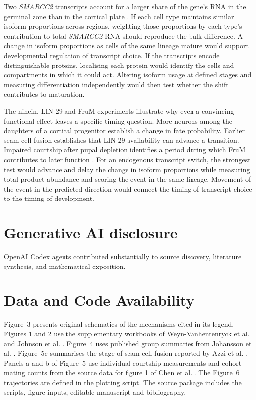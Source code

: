 \documentclass[11pt,a4paper]{article}
\begin{document}
Two \textit{SMARCC2} transcripts account for a larger share of the gene's RNA in the germinal zone than in the cortical plate \cite{Patowary2024}. If each cell type maintains similar isoform proportions across regions, weighting those proportions by each type's contribution to total \textit{SMARCC2} RNA should reproduce the bulk difference. A change in isoform proportions as cells of the same lineage mature would support developmental regulation of transcript choice. If the transcripts encode distinguishable proteins, localising each protein would identify the cells and compartments in which it could act. Altering isoform usage at defined stages and measuring differentiation independently would then test whether the shift contributes to maturation.

The ninein, LIN-29 and FruM experiments illustrate why even a convincing functional effect leaves a specific timing question. More neurons among the daughters of a cortical progenitor establish a change in fate probability. Earlier seam cell fusion establishes that LIN-29 availability can advance a transition. Impaired courtship after pupal depletion identifies a period during which FruM contributes to later function \cite{Zhang2016Nin,Azzi2020,Chen2021Fru}. For an endogenous transcript switch, the strongest test would advance and delay the change in isoform proportions while measuring total product abundance and scoring the event in the same lineage. Movement of the event in the predicted direction would connect the timing of transcript choice to the timing of development.

\section*{Generative AI disclosure}

OpenAI Codex agents contributed substantially to source discovery, literature synthesis, and mathematical exposition.

\section*{Data and Code Availability}

Figure~3 presents original schematics of the mechanisms cited in its legend. Figures 1 and 2 use the supplementary workbooks of Weyn-Vanhentenryck et al. and Johnson et al. \cite{Weyn2018,Johnson2019}. Figure~4 uses published group summaries from Johansson et al. \cite{Johansson2008}. Figure~5c summarises the stage of seam cell fusion reported by Azzi et al. \cite{Azzi2020}. Panels a and b of Figure~5 use individual courtship measurements and cohort mating counts from the source data for figure 1 of Chen et al. \cite{Chen2021Fru}. The Figure~6 trajectories are defined in the plotting script. The source package includes the scripts, figure inputs, editable manuscript and bibliography.
\end{document}
